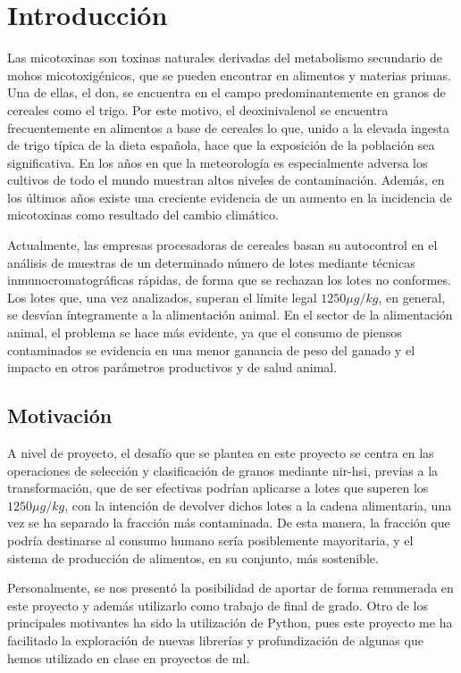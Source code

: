 \section{Introducción}

Las micotoxinas son toxinas naturales derivadas del metabolismo secundario de mohos micotoxigénicos, que se pueden encontrar en alimentos y materias primas. Una de ellas,
el \acrfull{don}, se encuentra en el campo predominantemente en granos de cereales como el trigo. Por este motivo, el deoxinivalenol se encuentra frecuentemente en
alimentos a base de cereales lo que, unido a la elevada ingesta de trigo típica de la dieta española, hace que la exposición de la población sea significativa. En los años
en que la meteorología es especialmente adversa los cultivos de todo el mundo muestran altos niveles de contaminación. Además, en los últimos años existe una creciente
evidencia de un aumento en la incidencia de micotoxinas como resultado del cambio climático.

Actualmente, las empresas procesadoras de cereales basan su autocontrol en el análisis de muestras de un determinado número de lotes mediante técnicas inmunocromatográficas
rápidas, de forma que se rechazan los lotes no conformes. Los lotes que, una vez analizados, superan el límite legal \(1250 \mu g/kg\), en general, se desvían íntegramente
a la alimentación animal. En el sector de la alimentación animal, el problema se hace más evidente, ya que el consumo de piensos contaminados se evidencia en una menor
ganancia de peso del ganado y el impacto en otros parámetros productivos y de salud animal.


\subsection{Motivación}


A nivel de proyecto, el desafío que se plantea en este proyecto se centra en las operaciones de selección y clasificación de granos mediante \acrfull{nir-hsi}, previas a la transformación, que
de ser efectivas podrían aplicarse a lotes que superen los \(1250 \mu g/kg\), con la intención de devolver dichos lotes a la cadena alimentaria, una vez se ha separado
la fracción más contaminada. De esta manera, la fracción que podría destinarse al consumo humano sería posiblemente mayoritaria, y el sistema de producción de alimentos,
en su conjunto, más sostenible.

Personalmente, se nos presentó la posibilidad de aportar de forma remunerada en este proyecto y además utilizarlo como trabajo de final de grado. Otro de los principales motivantes 
ha sido la utilización de Python, pues este proyecto me ha facilitado la exploración de nuevas librerías y profundización de algunas que hemos utilizado en 
clase en proyectos de \acrfull{ml}.



